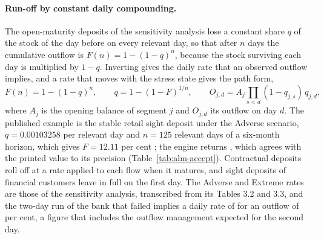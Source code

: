 \paragraph{Run-off by constant daily compounding.}
The open-maturity deposits of the sensitivity analysis lose a constant share $q$ of the stock of the day before on every relevant day, so that after $n$ days the cumulative outflow is $F(n)=1-(1-q)^{n}$, because the stock surviving each day is multiplied by $1-q$. Inverting gives the daily rate that an observed outflow implies, and a rate that moves with the stress state gives the path form,
\begin{equation}
F(n)=1-(1-q)^{n},\qquad q=1-(1-F)^{1/n},\qquad O_{j,d}=A_j\prod_{s<d}(1-q_{j,s})\,q_{j,d},
\label{eq:alm-runoff}
\end{equation}
where $A_j$ is the opening balance of segment $j$ and $O_{j,d}$ its outflow on day $d$. The published example is the stable retail sight deposit under the Adverse scenario, $q=0.00103258$ per relevant day and $n=125$ relevant days of a six-month horizon, which gives $F=12.11$ per cent \citep{alm:ecb2019note}; the engine returns \almLGoldenMetric{}, which agrees with the printed value to its precision (Table~\ref{tab:alm-accept}). Contractual deposits roll off at a rate applied to each flow when it matures, and sight deposits of financial customers leave in full on the first day. The Adverse and Extreme rates are those of the sensitivity analysis, transcribed from its Tables 3.2 and 3.3, and the two-day run of the bank that failed implies a daily rate of \almLSvbImpliedRate{} for an outflow of \almLSvbObserved{} per cent, a figure that includes the outflow management expected for the second day.

